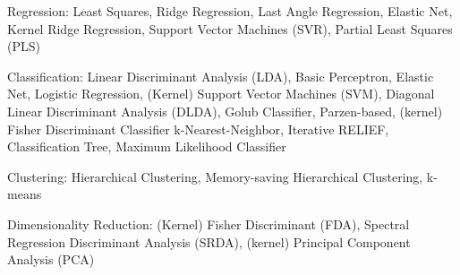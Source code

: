 Regression: Least Squares, Ridge Regression, Last Angle Regression, Elastic Net, Kernel Ridge Regression, Support Vector Machines (SVR), Partial Least Squares (PLS)

Classification: Linear Discriminant Analysis (LDA), Basic Perceptron, Elastic Net, Logistic Regression, (Kernel) Support Vector Machines (SVM), Diagonal Linear Discriminant Analysis (DLDA), Golub Classifier, Parzen-based, (kernel) Fisher Discriminant Classifier k-Nearest-Neighbor, Iterative RELIEF, Classification Tree, Maximum Likelihood Classifier

Clustering: Hierarchical Clustering, Memory-saving Hierarchical Clustering, k-means

Dimensionality Reduction: (Kernel) Fisher Discriminant (FDA), Spectral Regression Discriminant Analysis (SRDA), 
(kernel) Principal Component Analysis (PCA)
